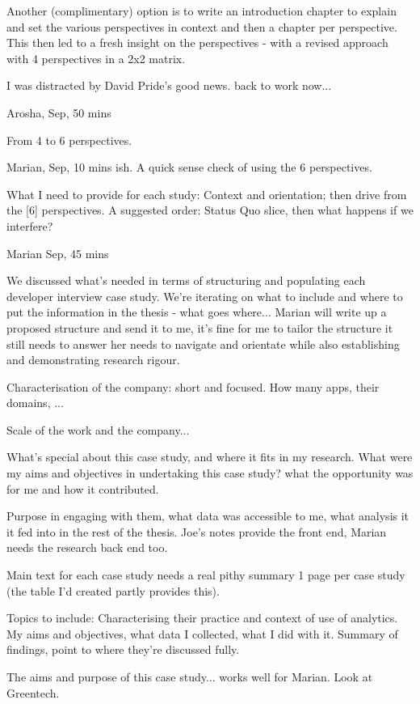 Another (complimentary) option is to write an introduction chapter to explain and set the various perspectives in context and then a chapter per perspective. This then led to a fresh insight on the perspectives - with a revised approach with 4 perspectives in a 2x2 matrix.

I was distracted by David Pride's good news. back to work now...

\dotfill
Arosha,  Sep, 50 mins

From 4 to 6 perspectives.

\dotfill
Marian,  Sep, 10 mins ish.
A quick sense check of using the 6 perspectives.

What I need to provide for each study:
Context and orientation; then drive from the [6] perspectives.
A suggested order: Status Quo slice, then what happens if we interfere?

\dotfill
Marian  Sep, 45 mins

We discussed what's needed in terms of structuring and populating each developer interview case study. We're iterating on what to include and where to put the information in the thesis - what goes where... Marian will write up a proposed structure and send it to me, it's fine for me to tailor the structure it still needs to answer her needs to navigate and orientate while also establishing and demonstrating research rigour. 

Characterisation of the company: short and focused. How many apps, their domains, ...

Scale of the work and the company...

What's special about this case study, and where it fits in my research. What were my aims and objectives in undertaking this case study? what the opportunity was for me and how it contributed. 

Purpose in engaging with them, what data was accessible to me, what analysis it it fed into in the rest of the thesis. Joe's notes provide the front end, Marian needs the research back end too. 

Main text for each case study needs a real pithy summary 1 page per case study (the table I'd created partly provides this). 

Topics to include: Characterising their practice and context of use of analytics. My aims and objectives, what data I collected, what I did with it. Summary of findings, point to where they're discussed fully. 

The aims and purpose of this case study... works well for Marian. Look at Greentech. 

